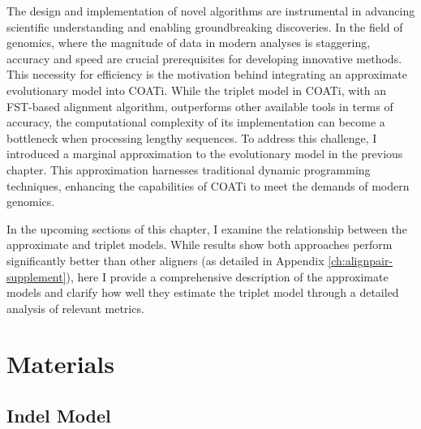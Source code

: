 
The design and implementation of novel algorithms are instrumental in advancing scientific understanding and enabling groundbreaking discoveries. In the field of genomics, where the magnitude of data in modern analyses is staggering, accuracy and speed are crucial prerequisites for developing innovative methods. This necessity for efficiency is the motivation behind integrating an approximate evolutionary model into COATi. While the triplet model in COATi, with an FST-based alignment algorithm, outperforms other available tools in terms of accuracy, the computational complexity of its implementation can become a bottleneck when processing lengthy sequences. To address this challenge, I introduced a marginal approximation to the evolutionary model in the previous chapter. This approximation harnesses traditional dynamic programming techniques, enhancing the capabilities of COATi to meet the demands of modern genomics.


In the upcoming sections of this chapter, I examine the relationship between the approximate and triplet models. While results show both approaches perform significantly better than other aligners (as detailed in Appendix \ref{ch:alignpair-supplement}), here I provide a comprehensive description of the approximate models and clarify how well they estimate the triplet model through a detailed analysis of relevant metrics.


\section{Materials}
\subsection{Indel Model}

